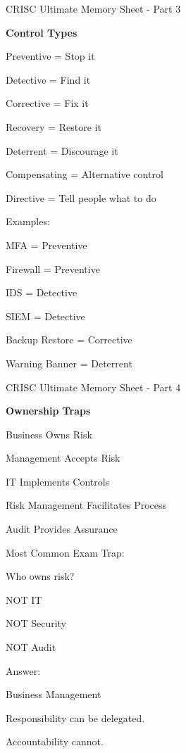 \documentclass{beamer}
\begin{document}
	\begin{frame}[shrink=5]{CRISC Ultimate Memory Sheet - Part 3}
		\footnotesize
		
		\textbf{Control Types}
		
		Preventive
		= Stop it
		
		Detective
		= Find it
		
		Corrective
		= Fix it
		
		Recovery
		= Restore it
		
		Deterrent
		= Discourage it
		
		Compensating
		= Alternative control
		
		Directive
		= Tell people what to do
		
		\medskip
		
		Examples:
		
		MFA = Preventive
		
		Firewall = Preventive
		
		IDS = Detective
		
		SIEM = Detective
		
		Backup Restore = Corrective
		
		Warning Banner = Deterrent
		
	\end{frame}
	
	\begin{frame}[shrink=5]{CRISC Ultimate Memory Sheet - Part 4}
		\footnotesize
		
		\textbf{Ownership Traps}
		
		Business Owns Risk
		
		Management Accepts Risk
		
		IT Implements Controls
		
		Risk Management Facilitates Process
		
		Audit Provides Assurance
		
		\medskip
		
		Most Common Exam Trap:
		
		Who owns risk?
		
		NOT IT
		
		NOT Security
		
		NOT Audit
		
		Answer:
		
		Business Management
		
		\medskip
		
		Responsibility can be delegated.
		
		Accountability cannot.
		
	\end{frame}
	
\end{document}
